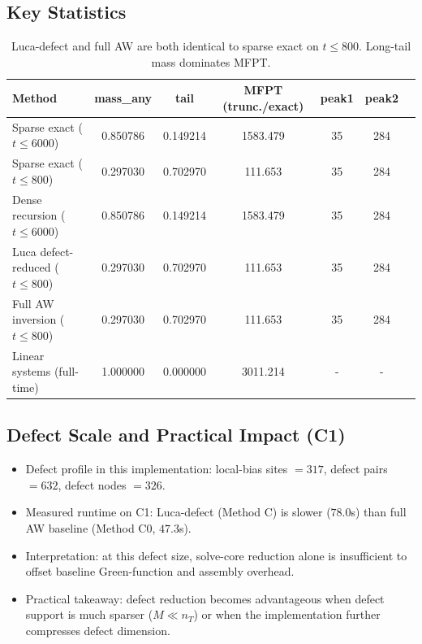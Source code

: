 \documentclass[11pt,a4paper]{article}
\begin{document}
\subsection{Key Statistics}
\begin{table}[H]
  \centering
  \small
  \begin{tabular}{lcccccc}
    \toprule
    Method & mass\_any & tail & MFPT (trunc./exact) & peak1 & peak2 \\
    \midrule
    Sparse exact ($t\le 6000$) & 0.850786 & 0.149214 & 1583.479 & 35 & 284 \\
    Sparse exact ($t\le 800$) & 0.297030 & 0.702970 & 111.653 & 35 & 284 \\
    Dense recursion ($t\le 6000$) & 0.850786 & 0.149214 & 1583.479 & 35 & 284 \\
    Luca defect-reduced ($t\le 800$) & 0.297030 & 0.702970 & 111.653 & 35 & 284 \\
    Full AW inversion ($t\le 800$) & 0.297030 & 0.702970 & 111.653 & 35 & 284 \\
    Linear systems (full-time) & 1.000000 & 0.000000 & 3011.214 & - & - \\
    \bottomrule
  \end{tabular}
  \caption{Luca-defect and full AW are both identical to sparse exact on $t\le 800$. Long-tail mass dominates MFPT.}
\end{table}

\subsection{Defect Scale and Practical Impact (C1)}
\begin{itemize}[leftmargin=2em]
  \item Defect profile in this implementation: local-bias sites $=317$, defect pairs $=632$, defect nodes $=326$.
  \item Measured runtime on C1: Luca-defect (Method C) is slower ($78.0$s) than full AW baseline (Method C0, $47.3$s).
  \item Interpretation: at this defect size, solve-core reduction alone is insufficient to offset baseline Green-function and assembly overhead.
  \item Practical takeaway: defect reduction becomes advantageous when defect support is much sparser ($M\ll n_T$) or when the implementation further compresses defect dimension.
\end{itemize}
\end{document}
